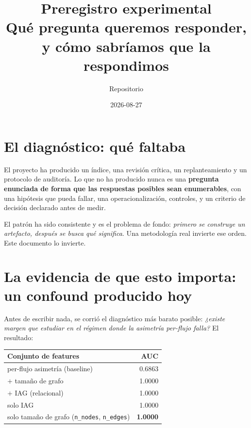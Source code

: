 \documentclass[11pt]{article}
\title{\textbf{\Large Preregistro experimental}\\[3pt]
\normalsize Qué pregunta queremos responder, y cómo sabríamos que la respondimos}
\author{\normalsize Repositorio \code{Ironsss/iag-symmetry}}
\date{\small 2026-08-27}
\newcommand{\code}[1]{\texttt{\small #1}}
\begin{document}
\maketitle
\thispagestyle{empty}
\vspace{-1.2em}

\section{El diagnóstico: qué faltaba}

El proyecto ha producido un índice, una revisión crítica, un replanteamiento y un protocolo de auditoría. Lo que no ha producido nunca es una \textbf{pregunta enunciada de forma que las respuestas posibles sean enumerables}, con una hipótesis que pueda fallar, una operacionalización, controles, y un criterio de decisión declarado antes de medir.

El patrón ha sido consistente y es el problema de fondo: \emph{primero se construye un artefacto, después se busca qué significa}. Una metodología real invierte ese orden. Este documento lo invierte.

\section{La evidencia de que esto importa: un confound producido hoy}

Antes de escribir nada, se corrió el diagnóstico más barato posible: \emph{¿existe margen que estudiar en el régimen donde la asimetría per-flujo falla?} El resultado:

\begin{center}
\begin{tabular}{lr}
\toprule
Conjunto de features & AUC \\
\midrule
per-flujo asimetría (baseline) & 0.6863 \\
$+$ tamaño de grafo & 1.0000 \\
$+$ IAG (relacional) & 1.0000 \\
solo IAG & 1.0000 \\
\rowcolor{crit!12} solo tamaño de grafo (\code{n\_nodes}, \code{n\_edges}) & \textbf{1.0000} \\
\bottomrule
\end{tabular}
\end{center}
\end{document}
